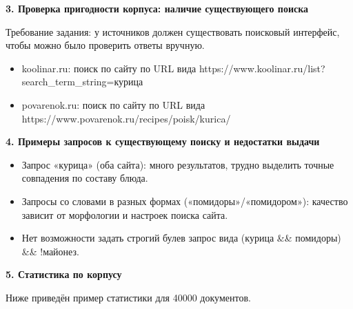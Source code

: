 \documentclass[12pt,a4paper]{article}
\begin{document}
\textbf{3. Проверка пригодности корпуса: наличие существующего поиска}

Требование задания: у источников должен существовать поисковый
интерфейс, чтобы можно было проверить ответы вручную.

\begin{itemize}
\item
  koolinar.ru: поиск по сайту по URL вида
  https://www.koolinar.ru/list?search\_term\_string=курица
\item
  povarenok.ru: поиск по сайту по URL вида
  https://www.povarenok.ru/recipes/poisk/kurica/
\end{itemize}

\textbf{4. Примеры запросов к существующему поиску и недостатки выдачи}

\begin{itemize}
\item
  Запрос «курица» (оба сайта): много результатов, трудно выделить точные
  совпадения по составу блюда.
\item
  Запросы со словами в разных формах («помидоры»/«помидором»): качество
  зависит от морфологии и настроек поиска сайта.
\item
  Нет возможности задать строгий булев запрос вида (курица \&\&
  помидоры) \&\& !майонез.
\end{itemize}

\textbf{5. Статистика по корпусу}

Ниже приведён пример статистики для 40000 документов.
\end{document}
